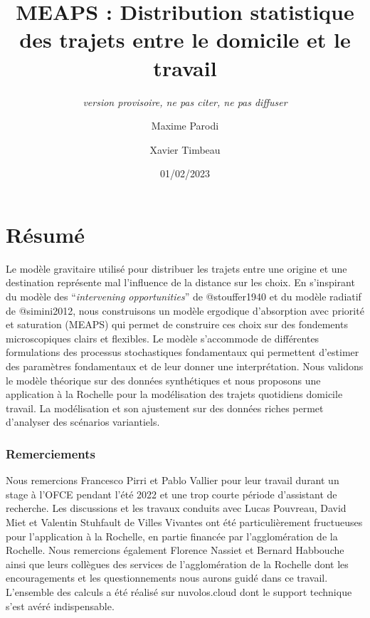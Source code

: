 \documentclass[
  10pt,
  a4paper,
  numbers=noendperiod,
  DIV=9]{scrreprt}
\title{MEAPS : Distribution statistique des trajets entre le domicile et
le travail}
\subtitle{\emph{version provisoire, ne pas citer, ne pas diffuser}}
\author{Maxime Parodi \and Xavier Timbeau}
\date{01/02/2023}
\renewcommand*\contentsname{Table des matières}
\newcommand\contentsname{Table des matières}
\begin{document}
\maketitle
\ifdefined\Shaded\renewenvironment{Shaded}{\begin{tcolorbox}[boxrule=0pt, frame hidden, borderline west={3pt}{0pt}{shadecolor}, sharp corners, breakable, enhanced, interior hidden]}{\end{tcolorbox}}\fi

\renewcommand*\contentsname{Table des matières}
{
\hypersetup{linkcolor=}
\setcounter{tocdepth}{0}
\tableofcontents
}

\hypertarget{ruxe9sumuxe9}{%
\chapter*{Résumé}\label{ruxe9sumuxe9}}


Le modèle gravitaire utilisé pour distribuer les trajets entre une
origine et une destination représente mal l'influence de la distance sur
les choix. En s'inspirant du modèle des ``\emph{intervening
opportunities}'' de @stouffer1940 et du modèle radiatif de @simini2012,
nous construisons un modèle ergodique d'absorption avec priorité et
saturation (MEAPS) qui permet de construire ces choix sur des fondements
microscopiques clairs et flexibles. Le modèle s'accommode de différentes
formulations des processus stochastiques fondamentaux qui permettent
d'estimer des paramètres fondamentaux et de leur donner une
interprétation. Nous validons le modèle théorique sur des données
synthétiques et nous proposons une application à la Rochelle pour la
modélisation des trajets quotidiens domicile travail. La modélisation et
son ajustement sur des données riches permet d'analyser des scénarios
variantiels.

\hypertarget{remerciements}{%
\subsection*{Remerciements}\label{remerciements}}

Nous remercions Francesco Pirri et Pablo Vallier pour leur travail
durant un stage à l'OFCE pendant l'été 2022 et une trop courte période
d'assistant de recherche. Les discussions et les travaux conduits avec
Lucas Pouvreau, David Miet et Valentin Stuhfault de Villes Vivantes ont
été particulièrement fructueuses pour l'application à la Rochelle, en
partie financée par l'agglomération de la Rochelle. Nous remercions
également Florence Nassiet et Bernard Habbouche ainsi que leurs
collègues des services de l'agglomération de la Rochelle dont les
encouragements et les questionnements nous aurons guidé dans ce travail.
L'ensemble des calculs a été réalisé sur nuvolos.cloud dont le support
technique s'est avéré indispensable.
\end{document}
